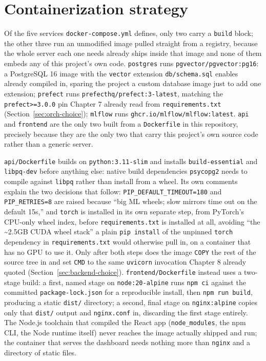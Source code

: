 \section{Containerization strategy}
\label{sec:containerization}
\begin{sloppypar}
Of the five services \texttt{docker-compose.yml} defines, only two carry a \texttt{build} block; the other three run an unmodified image pulled straight from a registry, because the whole server each one needs already ships inside that image and none of them embeds any of this project's own code. \texttt{postgres} runs \texttt{pgvector/\allowbreak pgvector:pg16}: a PostgreSQL 16 image with the \texttt{vector} extension \texttt{db/\allowbreak schema.sql} enables already compiled in, sparing the project a custom database image just to add one extension; \texttt{prefect} runs \texttt{prefecthq/\allowbreak prefect:3-latest}, matching the \texttt{prefect>=3.0.0} pin Chapter 7 already read from \texttt{requirements.txt} (Section~\ref{sec:orch-choice}); \texttt{mlflow} runs \texttt{ghcr.io/\allowbreak mlflow/\allowbreak mlflow:latest}. \texttt{api} and \texttt{frontend} are the only two built from a \texttt{Dockerfile} in this repository, precisely because they are the only two that carry this project's own source code rather than a generic server.
\end{sloppypar}

\begin{sloppypar}
\texttt{api/\allowbreak Dockerfile} builds on \texttt{python:3.11-slim} and installs \texttt{build-essential} and \texttt{libpq-dev} before anything else: native build dependencies \texttt{psycopg2} needs to compile against \texttt{libpq} rather than install from a wheel. Its own comments explain the two decisions that follow: \texttt{PIP\_DEFAULT\_TIMEOUT=180} and \texttt{PIP\_RETRIES=8} are raised because ``big ML wheels; slow mirrors time out on the default 15s,'' and \texttt{torch} is installed in its own separate step, from PyTorch's CPU-only wheel index, before \texttt{requirements.txt} is installed at all, avoiding ``the \textasciitilde2.5GB CUDA wheel stack'' a plain \texttt{pip install} of the unpinned \texttt{torch} dependency in \texttt{requirements.txt} would otherwise pull in, on a container that has no GPU to use it. Only after both steps does the image \texttt{COPY} the rest of the source tree in and set \texttt{CMD} to the same \texttt{uvicorn} invocation Chapter 8 already quoted (Section~\ref{sec:backend-choice}). \texttt{frontend/\allowbreak Dockerfile} instead uses a two-stage build: a first, named stage on \texttt{node:20-alpine} runs \texttt{npm ci} against the committed \texttt{package-lock.json} for a reproducible install, then \texttt{npm run build}, producing a static \texttt{dist/} directory; a second, final stage on \texttt{nginx:alpine} copies only that \texttt{dist/} output and \texttt{nginx.conf} in, discarding the first stage entirely. The Node.js toolchain that compiled the React app (\texttt{node\_modules}, the npm CLI, the Node runtime itself) never reaches the image actually shipped and run; the container that serves the dashboard needs nothing more than \texttt{nginx} and a directory of static files.
\end{sloppypar}

